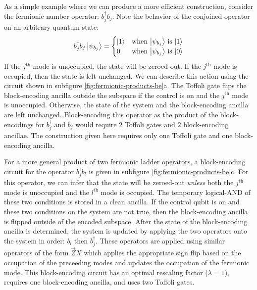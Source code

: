 As a simple example where we can produce a more efficient construction, consider the fermionic number operator: $b_j^\dagger b_j$.
Note the behavior of the conjoined operator on an arbitrary quantum state:
\begin{equation}
    \begin{split}
        b_j^\dagger b_j \ket{\psi_{b_j}} = \begin{cases} 
            \ket{1} & \text{when $\ket{\psi_{b_j}}$ is $\ket{1}$} \\
            0 & \text{when $\ket{\psi_{b_j}}$ is $\ket{0}$} \\
                                        \end{cases}
    \end{split}
\end{equation}
If the $j^\text{th}$ mode is unoccupied, the state will be zeroed-out.
If the $j^\text{th}$ mode is occupied, then the state is left unchanged.
We can describe this action using the circuit shown in subfigure \ref{fig:fermionic-products-be}a.
The Toffoli gate flips the block-encoding ancilla outside the subspace if the control is on and the $j^\text{th}$ mode is unoccupied.
Otherwise, the state of the system and the block-encoding ancilla are left unchanged.
Block-encoding this operator as the product of the block-encodings for $b_j^\dagger$ and $b_j$ would require $2$ Toffoli gates and $2$ block-encoding ancillae.
The construction given here requires only one Toffoli gate and one block-encoding ancilla.

For a more general product of two fermionic ladder operators, a block-encoding circuit for the operator $b_j^\dagger b_l$ is given in subfigure \ref{fig:fermionic-products-be}c.
For this operator, we can infer that the state will be zeroed-out \textit{unless} both the $j^\text{th}$ mode is unoccupied and the $l^\text{th}$ mode is occupied.
The temporary logical-AND of these two conditions is stored in a clean ancilla.
If the control qubit is on and these two conditions on the system are not true, then the block-encoding ancilla is flipped outside of the encoded subspace.
After the state of the block-encoding ancilla is determined, the system is updated by applying the two operators onto the system in order: $b_l$ then $b_j^\dagger$.
These operators are applied using similar operators of the form $\vec{Z}X$ which applies the appropriate sign flip based on the occupation of the preceeding modes and updates the occupation of the fermionic mode.
This block-encoding circuit has an optimal rescaling factor ($\lambda = 1$), requires one block-encoding ancilla, and uses two Toffoli gates.


